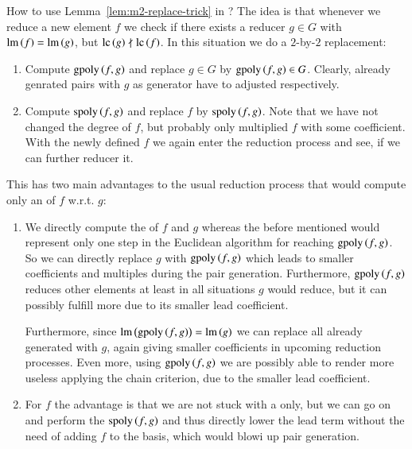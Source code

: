 How to use Lemma~\ref{lem:m2-replace-trick} in \bba ? The idea is that whenever
we reduce a new element $f$ we check if there exists a reducer $g\in G$ with
$\operatorname{lm}\left({f}\right) = \operatorname{lm}\left({g}\right)$, but $\mathrm{lc}\left({g}\right) \nmid \mathrm{lc}\left({f}\right)$. In this situation we do a $2$-by-$2$
replacement:
\begin{enumerate}
\item Compute $\mathrm{gpoly}\left({f},{g}\right)$ and replace $g\in G$ by $\mathrm{gpoly}\left({f},{g}\right) \in G$. Clearly,
already genrated pairs with $g$ as generator have to adjusted respectively.
\item Compute $\mathrm{spoly}\left({f},{g}\right)$ and replace $f$ by $\mathrm{spoly}\left({f},{g}\right)$. Note that we have not
changed the degree of $f$, but probably only multiplied $f$ with some
coefficient. With the newly defined $f$ we again enter the reduction process and
see, if we can further reducer it.
\end{enumerate}
This has two main advantages to the usual reduction process that would compute
only an \lcr of $f$ w.r.t. $g$:
\begin{enumerate}
\item We directly compute the \gpt of $f$ and $g$
whereas the before mentioned \lcr would represent only one step in the Euclidean
algorithm for reaching $\mathrm{gpoly}\left({f},{g}\right)$. So we can directly replace $g$ with
$\mathrm{gpoly}\left({f},{g}\right)$ which leads to smaller coefficients and multiples during the pair
generation. Furthermore, $\mathrm{gpoly}\left({f},{g}\right)$ reduces other elements at least in all
situations $g$ would reduce, but it can possibly fulfill more \ltrs due to its
smaller lead coefficient.

Furthermore, since $\operatorname{lm}\left({\mathrm{gpoly}\left({f},{g}\right)}\right) = \operatorname{lm}\left({g}\right)$ we can replace all \spts already generated
with $g$, again giving smaller coefficients in upcoming reduction processes.
Even more, using $\mathrm{gpoly}\left({f},{g}\right)$ we are possibly able to render more \spts useless
applying the chain criterion, due to the smaller lead coefficient.
\item For $f$ the advantage is that we are not stuck with a \lcr only, but we
can go on and perform the \ltr $\mathrm{spoly}\left({f},{g}\right)$ and thus directly lower the lead term
without the need of adding $f$ to the basis, which would blowi up pair
generation.
\end{enumerate}

